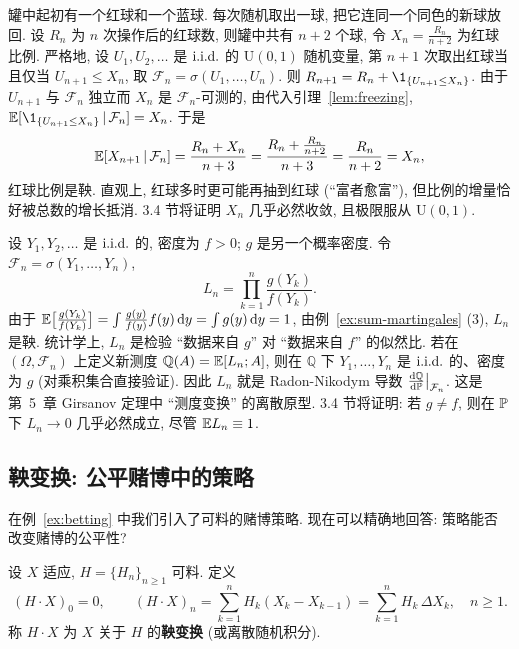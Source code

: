 \begin{example}[P\'olya 罐子]\label{ex:polya}
罐中起初有一个红球和一个蓝球. 每次随机取出一球, 把它连同一个同色的新球放回. 设 $R_n$ 为 $n$ 次操作后的红球数, 则罐中共有 $n+2$ 个球, 令 $X_n=\frac{R_n}{n+2}$ 为红球比例. 严格地, 设 $U_1,U_2,\dots$ 是 $\iid$ 的 $\mathrm{U}(0,1)$ 随机变量, 第 $n+1$ 次取出红球当且仅当 $U_{n+1}\le X_n$, 取 $\mathcal{F}_n=\sigma(U_1,\dots,U_n)$. 则 $R_{n+1}=R_n+\1_{\{U_{n+1}\le X_n\}}$. 由于 $U_{n+1}$ 与 $\mathcal{F}_n$ 独立而 $X_n$ 是 $\mathcal{F}_n$-可测的, 由代入引理~\ref{lem:freezing}, $\E[\1_{\{U_{n+1}\le X_n\}}\,|\,\mathcal{F}_n]=X_n$. 于是
\[
\E[X_{n+1}\,|\,\mathcal{F}_n]=\frac{R_n+X_n}{n+3}=\frac{R_n+\frac{R_n}{n+2}}{n+3}=\frac{R_n}{n+2}=X_n,
\]
红球比例是鞅. 直观上, 红球多时更可能再抽到红球 (``富者愈富''), 但比例的增量恰好被总数的增长抵消. 3.4 节将证明 $X_n$ 几乎必然收敛, 且极限服从 $\mathrm{U}(0,1)$.
\end{example}

\begin{example}[似然比鞅]\label{ex:likelihood-ratio}
设 $Y_1,Y_2,\dots$ 是 $\iid$ 的, 密度为 $f>0$; $g$ 是另一个概率密度. 令 $\mathcal{F}_n=\sigma(Y_1,\dots,Y_n)$,
\[
L_n=\prod_{k=1}^n\frac{g(Y_k)}{f(Y_k)}.
\]
由于 $\E\big[\frac{g(Y_k)}{f(Y_k)}\big]=\int\frac{g(y)}{f(y)}f(y)\dd y=\int g(y)\dd y=1$, 由例~\ref{ex:sum-martingales} (3), $L_n$ 是鞅. 统计学上, $L_n$ 是检验 ``数据来自 $g$'' 对 ``数据来自 $f$'' 的似然比. 若在 $(\Omega,\mathcal{F}_n)$ 上定义新测度 $\mathbb{Q}(A)=\E[L_n;A]$, 则在 $\mathbb{Q}$ 下 $Y_1,\dots,Y_n$ 是 $\iid$ 的、密度为 $g$ (对乘积集合直接验证). 因此 $L_n$ 就是 Radon-Nikodym 导数 $\frac{\dd\mathbb{Q}}{\dd\P}\big|_{\mathcal{F}_n}$. 这是第~5~章 Girsanov 定理中 ``测度变换'' 的离散原型. 3.4 节将证明: 若 $g\ne f$, 则在 $\P$ 下 $L_n\to0$ 几乎必然成立, 尽管 $\E L_n\equiv1$.
\end{example}

\subsection{鞅变换: 公平赌博中的策略}

在例~\ref{ex:betting} 中我们引入了可料的赌博策略. 现在可以精确地回答: 策略能否改变赌博的公平性?

\begin{definition}[鞅变换]\label{def:martingale-transform}
设 $X$ 适应, $H=\{H_n\}_{n\ge1}$ 可料. 定义
\[
(H\cdot X)_0=0,\qquad (H\cdot X)_n=\sum_{k=1}^nH_k(X_k-X_{k-1})=\sum_{k=1}^nH_k\,\Delta X_k,\quad n\ge1.
\]
称 $H\cdot X$ 为 $X$ 关于 $H$ 的\textbf{鞅变换} (或离散随机积分).
\end{definition}

